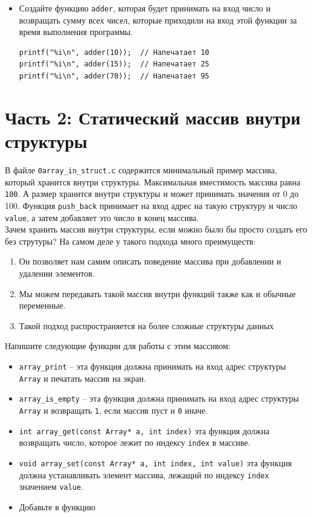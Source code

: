 \documentclass{article}
\begin{document}
\begin{itemize}
\item Создайте функцию \texttt{adder}, которая будет принимать на вход число и возвращать сумму всех чисел, которые приходили на вход этой функции за время выполнения программы.
\begin{lstlisting}
printf("%i\n", adder(10));  // Напечатает 10
printf("%i\n", adder(15));  // Напечатает 25
printf("%i\n", adder(70));  // Напечатает 95
\end{lstlisting}
\end{itemize}

\newpage
\section*{Часть 2: Статический массив внутри структуры}
В файле \texttt{0array\_in\_struct.c} содержится минимальный пример массива, который хранится внутри структуры. Максимальная вместимость массива равна \texttt{100}. А размер хранится внутри структуры и может принимать значения от 0 до 100. Функция \texttt{push\_back} принимает на вход адрес на такую структуру и число \texttt{value}, а затем добавляет это число в конец массива.\\

Зачем хранить массив внутри структуры, если можно было бы просто создать его без струтуры? На самом деле у такого подхода много преимуществ:
\begin{enumerate}
\item Он позволяет нам самим описать поведение массива при добавлении и удалении элементов.
\item Мы можем передавать такой массив внутри функций также как и обычные переменные.
\item Такой подход распространяется на более сложные структуры данных
\end{enumerate}

Напишите следующие функции для работы с этим массивом:
\begin{itemize}
\item \texttt{array\_print} -- эта функция должна принимать на вход адрес структуры \texttt{Array} и печатать массив на экран.
\item \texttt{array\_is\_empty} -- эта функция должна принимать на вход адрес структуры \texttt{Array} и возвращать \texttt{1}, если массив пуст и \texttt{0} иначе.
\item \texttt{int array\_get(const Array* a, int index)} эта функция должна возвращать число, которое лежит по индексу \texttt{index} в массиве.
\item \texttt{void array\_set(const Array* a, int index, int value)} эта функция должна устанавливать элемент массива, лежащий по индексу \texttt{index} значением \texttt{value}.
\item Добавьте в функцию
\end{itemize}
\end{document}
